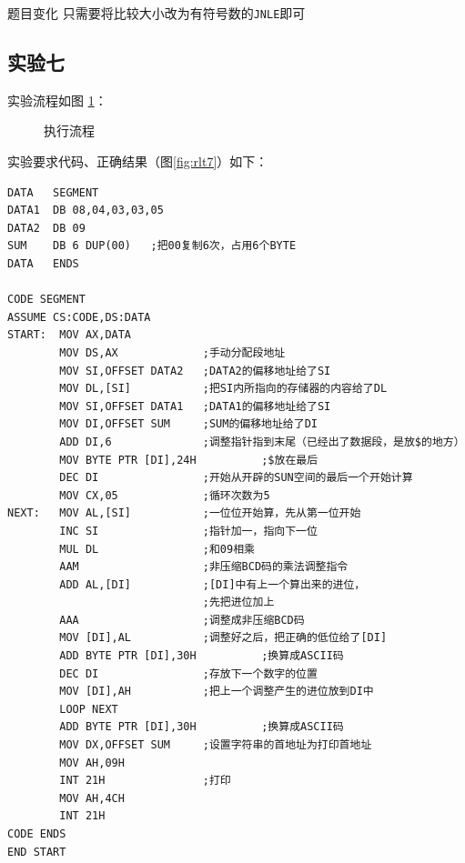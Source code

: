 \documentclass[11pt]{SEU-Digital-Report}
\begin{document}
\begin{note}{题目变化}{}
    只需要将比较大小改为有符号数的\texttt{JNLE}即可
\end{note}

\subsection{实验七}
实验流程如图 \ref{fig:exp37}：
\begin{figure}[hbpt]
    \centering
    
    \caption{执行流程}
    \label{fig:exp37}
\end{figure}

实验要求代码、正确结果（图\ref{fig:rlt7}）如下：
\begin{lstlisting}[language={[x86masm]Assembler},title=exp37.asm]
    DATA   SEGMENT
DATA1  DB 08,04,03,03,05
DATA2  DB 09
SUM    DB 6 DUP(00)   ;把00复制6次，占用6个BYTE
DATA   ENDS 
    
CODE SEGMENT
ASSUME CS:CODE,DS:DATA
START:  MOV AX,DATA          
        MOV DS,AX             ;手动分配段地址
        MOV SI,OFFSET DATA2   ;DATA2的偏移地址给了SI
        MOV DL,[SI]           ;把SI内所指向的存储器的内容给了DL
        MOV SI,OFFSET DATA1   ;DATA1的偏移地址给了SI
        MOV DI,OFFSET SUM     ;SUM的偏移地址给了DI
        ADD DI,6              ;调整指针指到末尾（已经出了数据段，是放$的地方）
        MOV BYTE PTR [DI],24H          ;$放在最后
        DEC DI                ;开始从开辟的SUN空间的最后一个开始计算
        MOV CX,05             ;循环次数为5
NEXT:   MOV AL,[SI]           ;一位位开始算，先从第一位开始
        INC SI                ;指针加一，指向下一位
        MUL DL                ;和09相乘
        AAM                   ;非压缩BCD码的乘法调整指令
        ADD AL,[DI]           ;[DI]中有上一个算出来的进位，
                              ;先把进位加上
        AAA                   ;调整成非压缩BCD码
        MOV [DI],AL           ;调整好之后，把正确的低位给了[DI]
        ADD BYTE PTR [DI],30H          ;换算成ASCII码
        DEC DI                ;存放下一个数字的位置
        MOV [DI],AH           ;把上一个调整产生的进位放到DI中
        LOOP NEXT
        ADD BYTE PTR [DI],30H          ;换算成ASCII码
        MOV DX,OFFSET SUM     ;设置字符串的首地址为打印首地址
        MOV AH,09H
        INT 21H               ;打印
        MOV AH,4CH
        INT 21H
CODE ENDS
END START    

\end{lstlisting}
\end{document}
